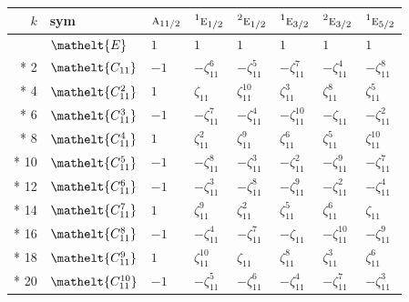 \documentclass[10pt,a4paper]{article}
\numberwithin{equation}{section}
\newcommand{\eltfont}[1]{{\let\sigma\eltsigma\mathelt{#1}}}
\newcommand{\irr}[1]{\text{\normalfont\scshape #1}}
\newcommand{\conjpair}[1]{{}^{#1}}
\newcommand{\cls}[1]{\eltfont{#1}}
\newcommand{\rootunity}[1]{\zeta_{#1}}
\begin{document}
{\small\setlength{\tabcolsep}{4pt}
\begin{longtable}{@{}rlllllll@{}}\toprule
$k$ & sym & $\irr{a}_{11/2}$ & $\conjpair{1}\irr{e}_{1/2}$ & $\conjpair{2}\irr{e}_{1/2}$ & $\conjpair{1}\irr{e}_{3/2}$ & $\conjpair{2}\irr{e}_{3/2}$ & $\conjpair{1}\irr{e}_{5/2}$\\\midrule\endhead
\bottomrule\endfoot\endlastfoot
0 & $\cls{E}$ & $1$ & $1$ & $1$ & $1$ & $1$ & $1$\\*
2 & $\cls{C_{11}}$ & $-1$ & $-\rootunity{11}^{6}$ & $-\rootunity{11}^{5}$ & $-\rootunity{11}^{7}$ & $-\rootunity{11}^{4}$ & $-\rootunity{11}^{8}$\\*
4 & $\cls{C_{11}^{2}}$ & $1$ & $\rootunity{11}$ & $\rootunity{11}^{10}$ & $\rootunity{11}^{3}$ & $\rootunity{11}^{8}$ & $\rootunity{11}^{5}$\\*
6 & $\cls{C_{11}^{3}}$ & $-1$ & $-\rootunity{11}^{7}$ & $-\rootunity{11}^{4}$ & $-\rootunity{11}^{10}$ & $-\rootunity{11}$ & $-\rootunity{11}^{2}$\\*
8 & $\cls{C_{11}^{4}}$ & $1$ & $\rootunity{11}^{2}$ & $\rootunity{11}^{9}$ & $\rootunity{11}^{6}$ & $\rootunity{11}^{5}$ & $\rootunity{11}^{10}$\\*
10 & $\cls{C_{11}^{5}}$ & $-1$ & $-\rootunity{11}^{8}$ & $-\rootunity{11}^{3}$ & $-\rootunity{11}^{2}$ & $-\rootunity{11}^{9}$ & $-\rootunity{11}^{7}$\\*
12 & $\cls{C_{11}^{6}}$ & $-1$ & $-\rootunity{11}^{3}$ & $-\rootunity{11}^{8}$ & $-\rootunity{11}^{9}$ & $-\rootunity{11}^{2}$ & $-\rootunity{11}^{4}$\\*
14 & $\cls{C_{11}^{7}}$ & $1$ & $\rootunity{11}^{9}$ & $\rootunity{11}^{2}$ & $\rootunity{11}^{5}$ & $\rootunity{11}^{6}$ & $\rootunity{11}$\\*
16 & $\cls{C_{11}^{8}}$ & $-1$ & $-\rootunity{11}^{4}$ & $-\rootunity{11}^{7}$ & $-\rootunity{11}$ & $-\rootunity{11}^{10}$ & $-\rootunity{11}^{9}$\\*
18 & $\cls{C_{11}^{9}}$ & $1$ & $\rootunity{11}^{10}$ & $\rootunity{11}$ & $\rootunity{11}^{8}$ & $\rootunity{11}^{3}$ & $\rootunity{11}^{6}$\\*
20 & $\cls{C_{11}^{10}}$ & $-1$ & $-\rootunity{11}^{5}$ & $-\rootunity{11}^{6}$ & $-\rootunity{11}^{4}$ & $-\rootunity{11}^{7}$ & $-\rootunity{11}^{3}$\\
\bottomrule\end{longtable}}
\end{document}

